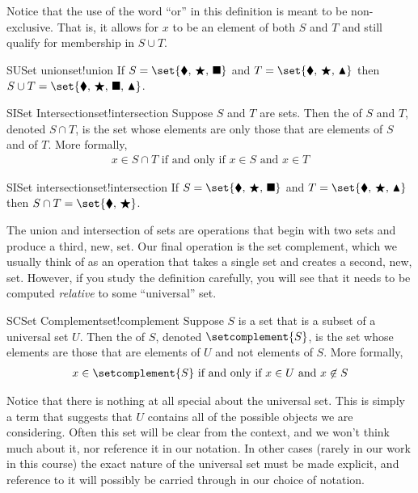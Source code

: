 %
Notice that the use of the word ``or'' in this definition is meant to be non-exclusive.  That is, it allows for $x$ to be an element of both $S$ and $T$ and still qualify for membership in $S\cup T$.
%
\begin{example}{SU}{Set union}{set!union}
If $S=\set{\blacklozenge,\,\bigstar,\,\blacksquare}$ and $T=\set{\blacklozenge,\,\bigstar,\,\blacktriangle}$ then $S\cup T=\set{\blacklozenge,\,\bigstar,\,\blacksquare,\,\blacktriangle}$.
\end{example}
%
\begin{definition}{SI}{Set Intersection}{set!intersection}
Suppose $S$ and $T$ are sets.  Then the  of $S$ and $T$, denoted $S\cap T$, is the set whose elements are only those that are elements of $S$ and of $T$.  More formally,
%
\begin{align*}
x\in S\cap T\text{ if and only if }x\in S\text{ and }x\in T
\end{align*}
%
\end{definition}
%
%
\begin{example}{SI}{Set intersection}{set!intersection}
If $S=\set{\blacklozenge,\,\bigstar,\,\blacksquare}$ and $T=\set{\blacklozenge,\,\bigstar,\,\blacktriangle}$ then $S\cap T=\set{\blacklozenge,\,\bigstar}$.
\end{example}
%
The union and intersection of sets are operations that begin with two sets and produce a third, new, set.  Our final operation is the set complement, which we usually think of as an operation that takes a single set and creates a second, new, set.  However, if you study the definition carefully, you will see that it needs to be computed {\em relative} to some ``universal'' set.
%
\begin{definition}{SC}{Set Complement}{set!complement}
Suppose $S$ is a set that is a subset of a universal set $U$.  Then the  of $S$, denoted $\setcomplement{S}$, is the set whose elements are those that are elements of $U$ and not elements of $S$.  More formally,
%
\begin{align*}
x\in\setcomplement{S}\text{ if and only if }x\in U\text{ and }x\not\in S
\end{align*}
%
\end{definition}
%
Notice that there is nothing at all special about the universal set.  This is simply a term that suggests that $U$ contains all of the possible objects we are considering.  Often this set will be clear from the context, and we won't think much about it, nor reference it in our notation.  In other cases (rarely in our work in this course) the exact nature of the universal set must be made explicit, and reference to it will possibly be carried through in our choice of notation.
